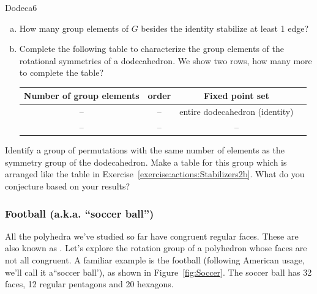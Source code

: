 \begin{exercise}{Dodeca6} 
\begin{enumerate}[(a)]
\item How many group elements of $G$ besides the identity stabilize at least 1 edge?
\item
Complete the following table to characterize the group elements of the rotational symmetries of a dodecahedron.  We show two rows, how many more to complete the table?  

\begin{tabular}{| c |c|c| r |} \hline
 \textbf{ Number of group elements} & \textbf{order} & \textbf{Fixed point set} \\ \hline
  --&  --& entire  dodecahedron (identity) \\ \hline
  -- & --&  -- \\ 
\end{tabular}
\end{enumerate}
\end{exercise}
\begin{exercise}{}

Identify a group of permutations with the same number of elements as the symmetry group of the dodecahedron. Make a table for this group which is arranged like the table in Exercise~\ref{exercise:actions:Stabilizers2b}. What do you conjecture based on your results?
\end{exercise}

\subsubsection*{Football (a.k.a. ``soccer ball'')}
All the polyhedra we've studied so far have congruent regular faces.  These are also known as .  Let's explore the rotation group of a polyhedron whose faces are not all congruent.  A familiar example is the football (following 
American usage, we'll call it a``soccer ball'), as shown in  Figure~\ref{fig:Soccer}.  The soccer ball has 32 faces, 12 regular pentagons and 20 hexagons.  

